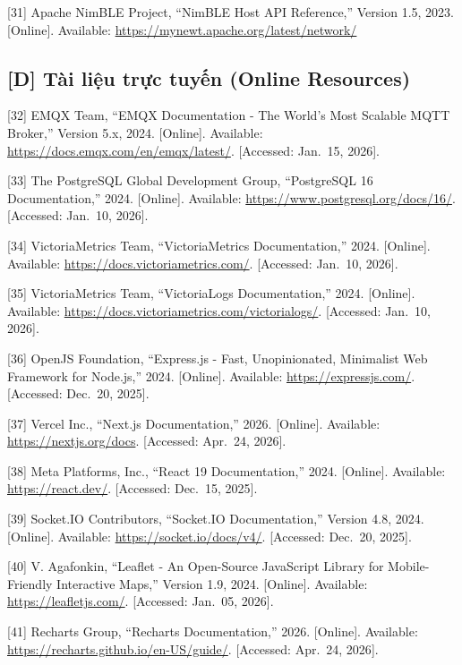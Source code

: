\documentclass[a4paper]{extarticle}
\begin{document}
{[}31{]} Apache NimBLE Project, ``NimBLE Host API Reference,'' Version 1.5, 2023. {[}Online{]}. Available: \url{https://mynewt.apache.org/latest/network/}


\subsection{{[}D{]} Tài liệu trực tuyến (Online Resources)}\label{d-tuxe0i-liux1ec7u-trux1ef1c-tuyux1ebfn-online-resources}

{[}32{]} EMQX Team, ``EMQX Documentation - The World's Most Scalable MQTT
Broker,'' Version 5.x, 2024. {[}Online{]}. Available:
\url{https://docs.emqx.com/en/emqx/latest/}. {[}Accessed: Jan.~15, 2026{]}.

{[}33{]} The PostgreSQL Global Development Group, ``PostgreSQL 16
Documentation,'' 2024. {[}Online{]}. Available:
\url{https://www.postgresql.org/docs/16/}. {[}Accessed: Jan.~10, 2026{]}.

{[}34{]} VictoriaMetrics Team, ``VictoriaMetrics Documentation,'' 2024.
{[}Online{]}. Available: \url{https://docs.victoriametrics.com/}. {[}Accessed:
Jan.~10, 2026{]}.

{[}35{]} VictoriaMetrics Team, ``VictoriaLogs Documentation,'' 2024.
{[}Online{]}. Available: \url{https://docs.victoriametrics.com/victorialogs/}.
{[}Accessed: Jan.~10, 2026{]}.

{[}36{]} OpenJS Foundation, ``Express.js - Fast, Unopinionated, Minimalist
Web Framework for Node.js,'' 2024. {[}Online{]}. Available:
\url{https://expressjs.com/}. {[}Accessed: Dec.~20, 2025{]}.

{[}37{]} Vercel Inc., ``Next.js Documentation,'' 2026. {[}Online{]}. Available:
\url{https://nextjs.org/docs}. {[}Accessed: Apr.~24,
2026{]}.

{[}38{]} Meta Platforms, Inc., ``React 19 Documentation,'' 2024. {[}Online{]}.
Available: \url{https://react.dev/}. {[}Accessed: Dec.~15, 2025{]}.

{[}39{]} Socket.IO Contributors, ``Socket.IO Documentation,'' Version 4.8, 2024. {[}Online{]}. Available: \url{https://socket.io/docs/v4/}. {[}Accessed:
Dec.~20, 2025{]}.

{[}40{]} V. Agafonkin, ``Leaflet - An Open-Source JavaScript Library for
Mobile-Friendly Interactive Maps,'' Version 1.9, 2024. {[}Online{]}.
Available: \url{https://leafletjs.com/}. {[}Accessed: Jan.~05, 2026{]}.

{[}41{]} Recharts Group, ``Recharts Documentation,'' 2026. {[}Online{]}.
Available:
\url{https://recharts.github.io/en-US/guide/}.
{[}Accessed: Apr.~24, 2026{]}.
\end{document}
